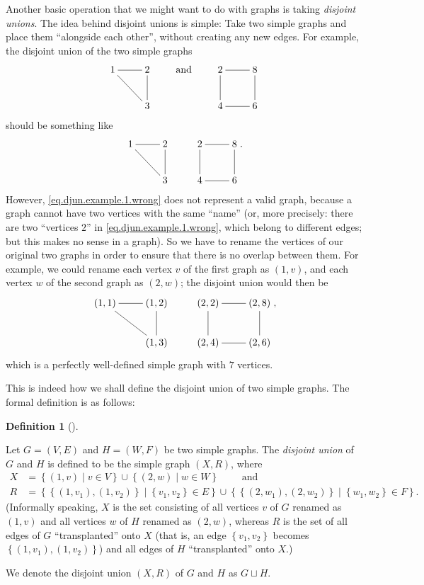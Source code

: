 \documentclass[numbers=enddot,12pt,final,onecolumn,notitlepage]{scrartcl}%
\makeatletter
\theoremstyle{definition}
\newtheorem{defi}[theo]{Definition}
\newenvironment{definition}[1][]
{\begin{defi}[#1]\begin{leftbar}}
{\end{leftbar}\end{defi}}
\newcommand{\set}[1]{\left\{ #1 \right\}}
\newcommand{\tup}[1]{\left( #1 \right)}
\newcommand{\are}{\ar@{-}}
\makeatother
\begin{document}
Another basic operation that we might want to do with graphs is
taking \textit{disjoint unions}.
The idea behind disjoint unions is simple:
Take two simple graphs and place them ``alongside each other'',
without creating any new edges.
For example, the disjoint union of the two simple graphs
\begin{equation}
\xymatrix{
1 \are[r] \are[rd] & 2 \are[d] \\
& 3
}
\qquad \text{ and } \qquad
\xymatrix{
2 \are[r] \are[d] & 8 \are[d] \\
4 \are[r] & 6
}
\label{eq.djun.example.1.two-graphs}
\end{equation}
should be something like
\begin{equation}
\xymatrix{
1 \are[r] \are[rd] & 2 \are[d] & 2 \are[r] \are[d] & 8 \are[d] \\
& 3 & 4 \are[r] & 6
} .
\label{eq.djun.example.1.wrong}
\end{equation}
However, \eqref{eq.djun.example.1.wrong} does not represent a
valid graph, because a graph cannot have two vertices with the
same ``name'' (or, more precisely: there are two
``vertices $2$'' in \eqref{eq.djun.example.1.wrong},
which belong to different edges; but this makes no sense
in a graph).
So we have to rename the vertices of our original two graphs
in order to ensure that there is no overlap between them.
For example, we could rename each vertex $v$ of the first graph
as $\tup{1, v}$, and each vertex $w$ of the second graph as
$\tup{2, w}$;
the disjoint union would then be
\begin{equation}
\xymatrix{
\tup{1,1} \are[r] \are[rd] & \tup{1,2} \are[d] & \tup{2,2} \are[r] \are[d] & \tup{2,8} \are[d] \\
& \tup{1,3} & \tup{2,4} \are[r] & \tup{2,6}
} ,
\label{eq.djun.example.1.right}
\end{equation}
which is a perfectly well-defined simple graph with $7$
vertices.

This is indeed how we shall define the disjoint union of two
simple graphs.
The formal definition is as follows:

\begin{definition} \label{def.djun.simple}
Let $G = \tup{V, E}$ and $H = \tup{W, F}$ be two simple graphs.
The \textit{disjoint union} of $G$ and $H$ is defined to be
the simple graph $\tup{X, R}$, where
\begin{align*}
X &= \set{ \tup{1, v} \mid v \in V } \cup \set{ \tup{2, w} \mid w \in W }
\qquad \text{ and} \\
R &= \set{ \set{\tup{1, v_1}, \tup{1, v_2}} \mid \set{v_1, v_2} \in E }
     \cup
	 \set{ \set{\tup{2, w_1}, \tup{2, w_2}} \mid \set{w_1, w_2} \in F } .
\end{align*}
(Informally speaking, $X$ is the set consisting of all vertices
$v$ of $G$ renamed as $\tup{1, v}$ and all vertices $w$ of $H$
renamed as $\tup{2, w}$, whereas $R$ is the set of all edges
of $G$ ``transplanted'' onto $X$ (that is, an edge $\set{v_1, v_2}$
becomes $\set{\tup{1, v_1}, \tup{1, v_2}}$) and all edges of $H$
``transplanted'' onto $X$.)

We denote the disjoint union $\tup{X, R}$ of $G$ and $H$ as
$G \sqcup H$.
\end{definition}
\end{document}
